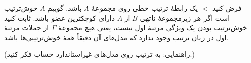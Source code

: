 فرض کنید $<$ یک رابطهٔ ترتیب خطی روی مجموعهٔ $A$ باشد. گوییم $A$ خوش‌ترتیب است اگر هر زیرمجموعهٔ ناتهی $B$ از $A$ دارای کوچکترین عضو باشد. ثابت کنید خوش‌ترتیب بودن یک ویژگی مرتبهٔ اول نیست، یعنی هیچ مجموعهٔ $\Gamma$ از جملات مرتبهٔ اول در زبان ترتیب وجود ندارد که مدل‌های آن دقیقاً همهٔ خوش‌ترتیبی‌ها باشد.

(راهنمایی: به ترتیب روی مدل‌های غیراستاندارد حساب فکر کنید.)